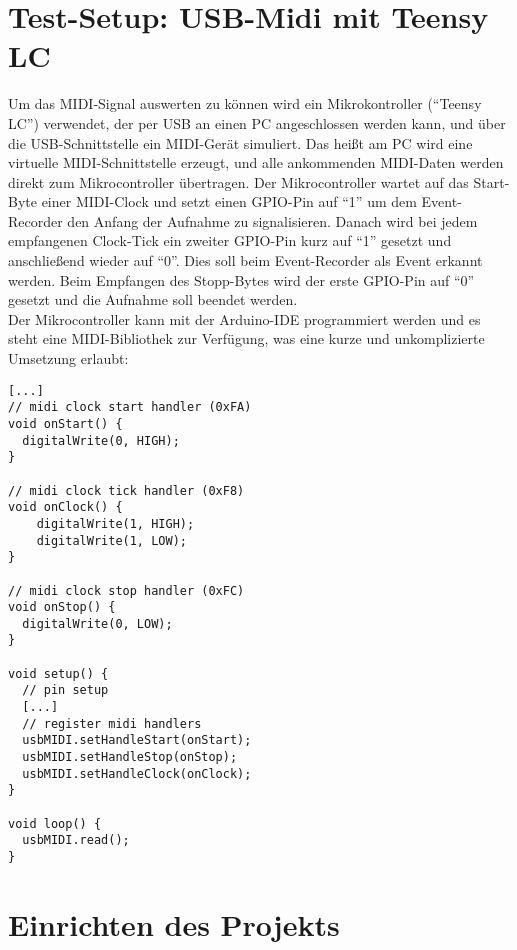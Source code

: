 \section{Test-Setup: USB-Midi mit Teensy LC}
  
Um das MIDI-Signal auswerten zu können wird ein Mikrokontroller (``Teensy LC'') verwendet, der per USB an einen PC angeschlossen werden kann, und über die USB-Schnittstelle ein MIDI-Gerät simuliert.  Das heißt am PC wird eine virtuelle MIDI-Schnittstelle erzeugt, und alle ankommenden MIDI-Daten werden direkt zum Mikrocontroller übertragen. Der Mikrocontroller wartet auf das Start-Byte einer MIDI-Clock und setzt einen GPIO-Pin auf ``1'' um dem Event-Recorder den Anfang der Aufnahme zu signalisieren. 
Danach wird bei jedem empfangenen Clock-Tick ein zweiter GPIO-Pin kurz auf ``1'' gesetzt und anschließend wieder auf ``0''. Dies soll beim Event-Recorder als Event erkannt werden. Beim Empfangen des Stopp-Bytes wird der erste GPIO-Pin auf ``0'' gesetzt und die Aufnahme soll beendet werden.\\
Der Mikrocontroller kann mit der Arduino-IDE programmiert werden und es steht eine MIDI-Bibliothek zur Verfügung, was eine kurze und unkomplizierte Umsetzung erlaubt:
\begin{verbatim}
[...]
// midi clock start handler (0xFA)
void onStart() {
  digitalWrite(0, HIGH);
}

// midi clock tick handler (0xF8) 
void onClock() {
    digitalWrite(1, HIGH);
    digitalWrite(1, LOW);
}

// midi clock stop handler (0xFC)
void onStop() {
  digitalWrite(0, LOW);
}

void setup() {
  // pin setup
  [...]
  // register midi handlers
  usbMIDI.setHandleStart(onStart);
  usbMIDI.setHandleStop(onStop);
  usbMIDI.setHandleClock(onClock);
}

void loop() {
  usbMIDI.read();
}
\end{verbatim}

\section{Einrichten des Projekts}
\label{ch:Anwendungsfall:sec:Einrichten}

